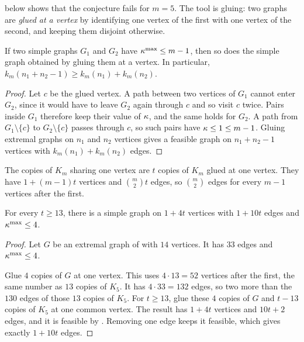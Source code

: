  below shows that the conjecture fails for $m=5$.
The tool is gluing: two graphs are \emph{glued at a vertex} by identifying one vertex of the first with one vertex of the second, and keeping them disjoint otherwise.

\begin{lemma}\label{lem:glue-vertex}
If two simple graphs $G_1$ and $G_2$ have $\kappa^{\max}\le m-1$, then so does the simple graph obtained by gluing them at a vertex.
In particular, $k_m(n_1+n_2-1) \ge k_m(n_1)+k_m(n_2)$.
\end{lemma}

\begin{proof}
Let $c$ be the glued vertex.
A path between two vertices of $G_1$ cannot enter $G_2$, since it would have to leave $G_2$ again through $c$ and so visit $c$ twice.
Pairs inside $G_1$ therefore keep their value of $\kappa$, and the same holds for $G_2$.
A path from $G_1 \setminus \{c\}$ to $G_2 \setminus \{c\}$ passes through $c$, so such pairs have $\kappa \le 1 \le m-1$.
Gluing extremal graphs on $n_1$ and $n_2$ vertices gives a feasible graph on $n_1+n_2-1$ vertices with $k_m(n_1)+k_m(n_2)$ edges.
\end{proof}

The copies of $K_m$ sharing one vertex are $t$ copies of $K_m$ glued at one vertex.
They have $1+(m-1)t$ vertices and $\binom m2 t$ edges, so $\binom m2$ edges for every $m-1$ vertices after the first.

\begin{theorem}[The Bollob\'{a}s--Erd\H{o}s conjecture fails for $m=5$]\label{thm:bollobas-erdos-false}
For every $t\ge13$, there is a simple graph on $1+4t$ vertices with $1+10t$ edges and $\kappa^{\max}\le 4$.
\end{theorem}

\begin{proof}
Let $G$ be an extremal graph of  with $14$ vertices. It has $33$ edges and $\kappa^{\max}\le4$.

Glue $4$ copies of $G$ at one vertex. This uses $4\cdot13=52$ vertices after the first, the same number as $13$ copies of $K_5$.
It has $4\cdot33=132$ edges, so two more than the $130$ edges of those $13$ copies of $K_5$.
For $t\ge13$, glue these $4$ copies of $G$ and $t-13$ copies of $K_5$ at one common vertex.
The result has $1+4t$ vertices and $10t+2$ edges, and it is feasible by .
Removing one edge keeps it feasible, which gives exactly $1+10t$ edges.
\end{proof}

